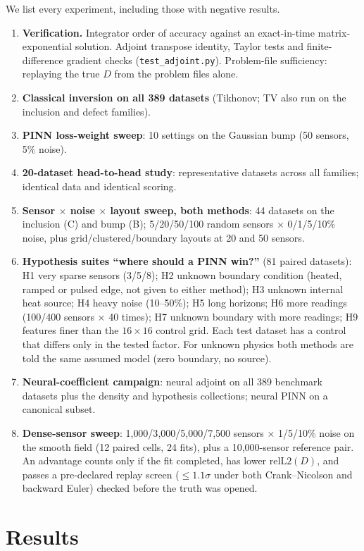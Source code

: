 \documentclass[twoside,english]{article}
\newcommand{\relL}{\mathrm{relL2}(D)}
\begin{document}
We list every experiment, including those with negative results.
\begin{enumerate}
\item \textbf{Verification.} Integrator order of accuracy against an exact-in-time matrix-exponential solution. Adjoint transpose identity, Taylor tests and finite-difference gradient checks (\texttt{test\_adjoint.py}). Problem-file sufficiency: replaying the true $D$ from the problem files alone.
\item \textbf{Classical inversion on all 389 datasets} (Tikhonov; TV also run on the inclusion and defect families).
\item \textbf{PINN loss-weight sweep}: 10 settings on the Gaussian bump (50 sensors, 5\% noise).
\item \textbf{20-dataset head-to-head study}: representative datasets across all families; identical data and identical scoring.
\item \textbf{Sensor $\times$ noise $\times$ layout sweep, both methods}: 44 datasets on the inclusion (C) and bump (B); 5/20/50/100 random sensors $\times$ 0/1/5/10\% noise, plus grid/clustered/boundary layouts at 20 and 50 sensors.
\item \textbf{Hypothesis suites ``where should a PINN win?''} (81 paired datasets): H1 very sparse sensors (3/5/8); H2 unknown boundary condition (heated, ramped or pulsed edge, not given to either method); H3 unknown internal heat source; H4 heavy noise (10--50\%); H5 long horizons; H6 more readings (100/400 sensors $\times$ 40 times); H7 unknown boundary with more readings; H9 features finer than the $16\times16$ control grid. Each test dataset has a control that differs only in the tested factor. For unknown physics both methods are told the same assumed model (zero boundary, no source).
\item \textbf{Neural-coefficient campaign}: neural adjoint on all 389 benchmark datasets plus the density and hypothesis collections; neural PINN on a canonical subset.
\item \textbf{Dense-sensor sweep}: 1{,}000/3{,}000/5{,}000/7{,}500 sensors $\times$ 1/5/10\% noise on the smooth field (12 paired cells, 24 fits), plus a 10{,}000-sensor reference pair. An advantage counts only if the fit completed, has lower $\relL$, and passes a pre-declared replay screen ($\le1.1\sigma$ under both Crank--Nicolson and backward Euler) checked before the truth was opened.
\end{enumerate}

\section{Results}\label{sec:results}
\end{document}
